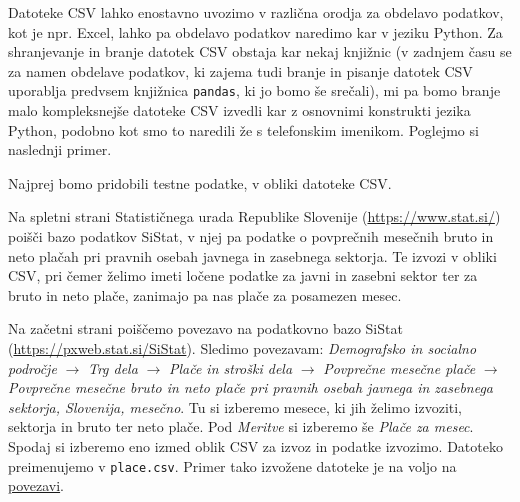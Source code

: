 Datoteke CSV lahko enostavno uvozimo v različna orodja za obdelavo podatkov, kot je npr. Excel, lahko pa obdelavo podatkov naredimo kar v jeziku Python. Za shranjevanje in branje datotek CSV obstaja kar nekaj knjižnic (v zadnjem času se za namen obdelave podatkov, ki zajema tudi branje in pisanje datotek CSV uporablja predvsem knjižnica \texttt{pandas}, ki jo bomo še srečali), mi pa bomo branje malo kompleksnejše datoteke CSV izvedli kar z osnovnimi konstrukti jezika Python, podobno kot smo to naredili že s telefonskim imenikom. Poglejmo si naslednji primer. 

Najprej bomo pridobili testne podatke, v obliki datoteke CSV.
\begin{zgled}
Na spletni strani Statističnega urada Republike Slovenije (\url{https://www.stat.si/}) poišči bazo podatkov SiStat, v njej pa podatke o povprečnih mesečnih bruto in neto plačah pri pravnih osebah javnega in zasebnega sektorja. Te izvozi v obliki CSV, pri čemer želimo imeti ločene podatke za javni in zasebni sektor ter za bruto in neto plače, zanimajo pa nas plače za posamezen mesec.
\end{zgled}

\begin{resitev}
Na začetni strani poiščemo povezavo na podatkovno bazo SiStat\\ (\url{https://pxweb.stat.si/SiStat}). Sledimo povezavam: \emph{Demografsko in socialno področje} $\rightarrow$ \emph{Trg dela} $\rightarrow$ \emph{Plače in stroški dela} $\rightarrow$ \emph{Povprečne mesečne plače} $\rightarrow$ \emph{Povprečne mesečne bruto in neto plače pri pravnih osebah javnega in zasebnega sektorja, Slovenija, mesečno}. Tu si izberemo mesece, ki jih želimo izvoziti, sektorja in bruto ter neto plače. Pod \emph{Meritve} si izberemo še \emph{Plače za mesec}. Spodaj si izberemo eno izmed oblik CSV za izvoz in podatke izvozimo. Datoteko preimenujemo v \texttt{place.csv}. Primer tako izvožene datoteke je na voljo na \href{https://raw.githubusercontent.com/mmoskon/OP_skripta/master/resitve/place.csv}{povezavi}. 
\end{resitev}

